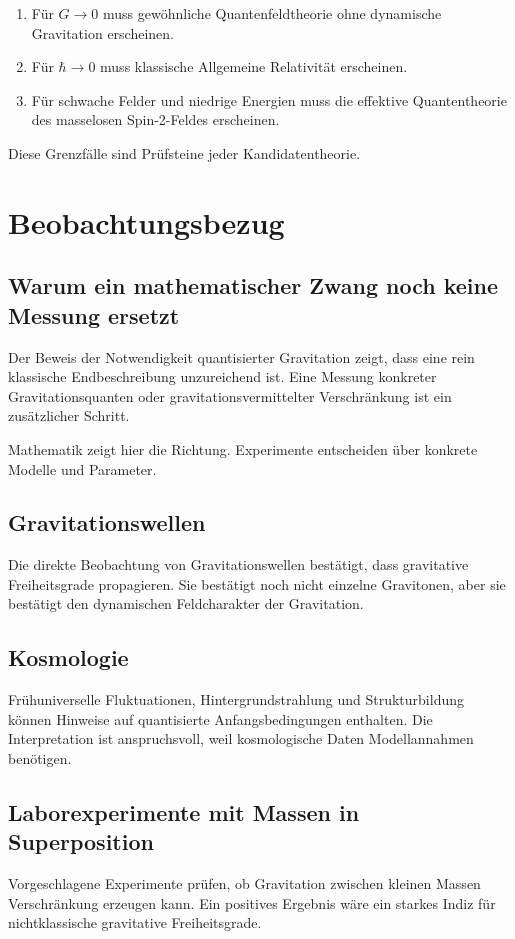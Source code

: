 \documentclass[11pt,a4paper,oneside]{book}
\theoremstyle{definition}
\theoremstyle{plain}
\theoremstyle{remark}
\begin{document}
\begin{enumerate}[label=\arabic*.]
\item Für $G\to 0$ muss gewöhnliche Quantenfeldtheorie ohne dynamische Gravitation erscheinen.
\item Für $\hbar\to 0$ muss klassische Allgemeine Relativität erscheinen.
\item Für schwache Felder und niedrige Energien muss die effektive Quantentheorie des masselosen Spin-2-Feldes erscheinen.
\end{enumerate}

Diese Grenzfälle sind Prüfsteine jeder Kandidatentheorie.

\chapter{Beobachtungsbezug}
\section{Warum ein mathematischer Zwang noch keine Messung ersetzt}
Der Beweis der Notwendigkeit quantisierter Gravitation zeigt, dass eine rein klassische Endbeschreibung unzureichend ist. Eine Messung konkreter Gravitationsquanten oder gravitationsvermittelter Verschränkung ist ein zusätzlicher Schritt.

Mathematik zeigt hier die Richtung. Experimente entscheiden über konkrete Modelle und Parameter.

\section{Gravitationswellen}
Die direkte Beobachtung von Gravitationswellen bestätigt, dass gravitative Freiheitsgrade propagieren. Sie bestätigt noch nicht einzelne Gravitonen, aber sie bestätigt den dynamischen Feldcharakter der Gravitation.

\section{Kosmologie}
Frühuniverselle Fluktuationen, Hintergrundstrahlung und Strukturbildung können Hinweise auf quantisierte Anfangsbedingungen enthalten. Die Interpretation ist anspruchsvoll, weil kosmologische Daten Modellannahmen benötigen.

\section{Laborexperimente mit Massen in Superposition}
Vorgeschlagene Experimente prüfen, ob Gravitation zwischen kleinen Massen Verschränkung erzeugen kann. Ein positives Ergebnis wäre ein starkes Indiz für nichtklassische gravitative Freiheitsgrade.
\end{document}
